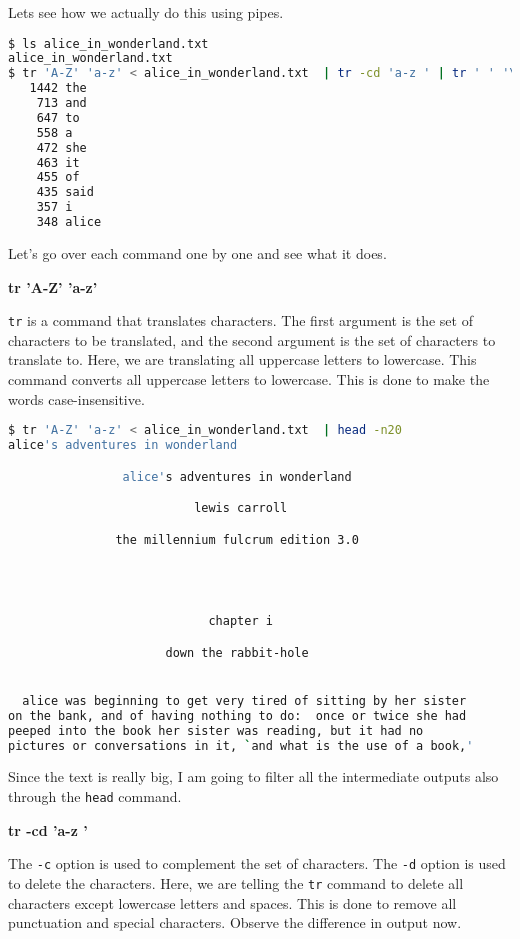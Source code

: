 Lets see how we actually do this using pipes.

\begin{lstlisting}[language=bash]
$ ls alice_in_wonderland.txt
alice_in_wonderland.txt
$ tr 'A-Z' 'a-z' < alice_in_wonderland.txt  | tr -cd 'a-z ' | tr ' ' '\n' | grep . | sort | uniq -c | sort -nr | head
   1442 the
    713 and
    647 to
    558 a
    472 she
    463 it
    455 of
    435 said
    357 i
    348 alice
\end{lstlisting}

Let's go over each command one by one and see what it does.

\textbf{tr 'A-Z' 'a-z'}

\lstinline|tr| is a command that translates characters. The first argument
is the set of characters to be translated, and the second argument is
the set of characters to translate to. Here, we are translating all
uppercase letters to lowercase.
This command converts all uppercase letters to lowercase. This is done
to make the words case-insensitive.

\begin{lstlisting}[language=bash]
$ tr 'A-Z' 'a-z' < alice_in_wonderland.txt  | head -n20
alice's adventures in wonderland

                alice's adventures in wonderland

                          lewis carroll

               the millennium fulcrum edition 3.0




                            chapter i

                      down the rabbit-hole


  alice was beginning to get very tired of sitting by her sister
on the bank, and of having nothing to do:  once or twice she had
peeped into the book her sister was reading, but it had no
pictures or conversations in it, `and what is the use of a book,'
\end{lstlisting}

\begin{remark}
  Since the text is really big, I am  going to filter all the
  intermediate outputs also through the \lstinline|head| command.
\end{remark}

\textbf{tr -cd 'a-z '}

The \lstinline|-c| option is used to complement the set of characters.
The \lstinline|-d| option is used to delete the characters. Here, we are
telling the \lstinline|tr| command to delete all characters except lowercase
letters and spaces. This is done to remove all punctuation and special
characters. Observe the difference in output now.

